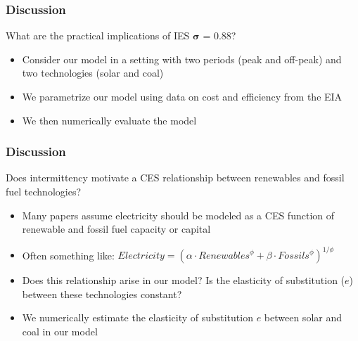 \documentclass[aspectratio=169]{beamer}
\begin{document}
\begin{frame}
\frametitle{Discussion}

\vspace{2em}

\begin{block}{\centering What are the practical implications of IES $\boldsymbol{\sigma}$ = 0.88?}
\end{block}

\vspace{1em}

\begin{itemize}
	\setlength\itemsep{0.5em}
	\item Consider our model in a setting with two periods (peak and off-peak) and two technologies (solar and coal)
	\item We parametrize our  model using data on cost and efficiency from the EIA
	\item We then numerically evaluate the model
\end{itemize}

\end{frame}


\begin{frame}
\frametitle{Discussion}

\vspace{2em}

\begin{block}{Does intermittency motivate a CES relationship between renewables and fossil fuel technologies? }
	\begin{itemize}
		\setlength\itemsep{0.5em}
		\item<1-> Many papers assume electricity should be modeled as a CES function of renewable and fossil fuel capacity or capital
		\item<1-> Often something like: $Electricity = (\alpha \cdot {Renewables}^\phi + \beta \cdot {Fossils}^\phi)^{1/\phi}$
		\item<2-> Does this relationship arise in our model? Is the elasticity of substitution ($e$) between these technologies constant? 
		\item<2-> We numerically estimate the elasticity of substitution $e$ between solar and coal in our model
	\end{itemize}
\end{block}

\vspace{1em}

\end{frame}
\end{document}
